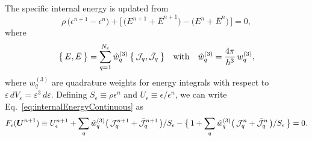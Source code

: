 \documentclass[12pt]{article}
\begin{document}
The specific internal energy is updated from
\begin{equation}
  \rho\,\big(\epsilon^{n+1}-\epsilon^{n}\big)
  +\big[\,\big(E^{n+1}+\bar{E}^{n+1}\big)-\big(E^{n}+\bar{E}^{n}\big)\,\big] = 0,
  \label{eq:internalEnergyContinuous}
\end{equation}
where
\begin{equation}
  \big\{\,E,\bar{E}\,\big\}
  =\sum_{q=1}^{N_{\varepsilon}}\hat{w}_{q}^{(3)}\,\big\{\,\mathcal{J}_{q},\bar{\mathcal{J}}_{q}\,\big\}
  \quad\text{with}\quad
  \hat{w}_{q}^{(3)}=\frac{4\pi}{h^{3}}\,w_{q}^{(3)},
\end{equation}
where $w_{q}^{(3)}$ are quadrature weights for energy integrals with respect to $\varepsilon\,dV_{\varepsilon}=\varepsilon^{3}\,d\varepsilon$.  
Defining $S_{\epsilon}\equiv\rho\epsilon^{n}$ and $U_{\epsilon}\equiv\epsilon/\epsilon^{n}$, we can write Eq.~\eqref{eq:internalEnergyContinuous} as
\begin{equation}
  F_{\epsilon}(\boldsymbol{U}^{n+1})\equiv
  U_{\epsilon}^{n+1} + \sum_{q}\hat{w}_{q}^{(3)}\big(\,\mathcal{J}_{q}^{n+1}+\bar{\mathcal{J}}_{q}^{n+1}\,\big)/S_{\epsilon}
  -\big\{\,1+\sum_{q}\hat{w}_{q}^{(3)}\big(\,\mathcal{J}_{q}^{n}+\bar{\mathcal{J}}_{q}^{n}\,\big)/S_{\epsilon}\,\big\} = 0.  
  \label{eq:internalEnergyDiscrete}
\end{equation}
\end{document}
